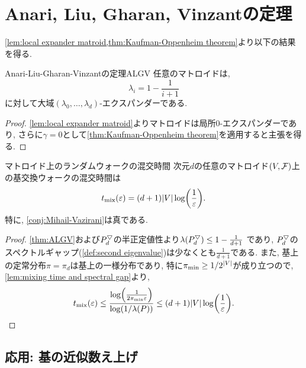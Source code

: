 \section{Anari, Liu, Gharan, Vinzantの定理}
\cref{lem:local expander matroid,thm:Kaufman-Oppenheim theorem}より以下の結果を得る.
\begin{theorem}{Anari-Liu-Gharan-Vinzantの定理}{ALGV}
    任意のマトロイドは,
    \[ \lambda_i = 1-\frac{1}{i+1}\]
    に対して大域$(\lambda_0,\dots,\lambda_d)$-エクスパンダーである.
\end{theorem}
\begin{proof}
    \cref{lem:local expander matroid}よりマトロイドは局所$0$-エクスパンダーであり, さらに$\gamma=0$として\cref{thm:Kaufman-Oppenheim theorem}を適用すると主張を得る.
\end{proof}
\begin{corollary}{マトロイド上のランダムウォークの混交時間}{}
    次元$d$の任意のマトロイド$(V,\mathcal{F})$上の基交換ウォークの混交時間は
    \[
        \tmix(\varepsilon) = (d+1)|V|\log\rbra*{\frac{1}{\varepsilon}}.
    \]
    特に, \cref{conj:Mihail-Vazirani}は真である.
\end{corollary}
\begin{proof}
    \cref{thm:ALGV}および$P^{\bigtriangledown}_d$の半正定値性より$\lambda(P^{\bigtriangledown}_d) \le 1-\frac{1}{d+1}$ であり, $P^{\bigtriangledown}_d$のスペクトルギャップ(\cref{def:second eigenvalue})は少なくとも$\frac{1}{d+1}$である.
    また, 基上の定常分布$\pi=\pi_d$は基上の一様分布であり, 特に$\pi_{\min} \ge 1/2^{|V|}$が成り立つので, \cref{lem:mixing time and spectral gap}より, 
    \[
        \tmix(\varepsilon) \le \frac{\log\rbra*{\frac{1}{2\pimin\varepsilon}}}{\log(1/\lambda(P))} \le (d+1)|V|\log\rbra*{\frac{1}{\varepsilon}}.
    \]
\end{proof}

\subsection{応用: 基の近似数え上げ}
